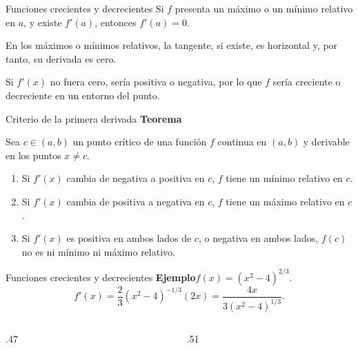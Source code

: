 \documentclass[main.tex]{subfiles}
\begin{document}
\begin{frame}{Funciones crecientes y decrecientes}
Si $f$ presenta un máximo o un mínimo relativo en $a$, y existe $f'(a)$, entonces $f'(a)=0$.
\medskip

En los máximos o mínimos relativos, la tangente, si existe, es horizontal y, por tanto, su derivada es cero.
\medskip

Si $f'(x)$ no fuera cero, sería positiva o negativa, por lo que $f$ sería creciente o decreciente en un entorno del punto.
\end{frame}
\begin{frame}{Criterio de la primera derivada}
\small\textbf{Teorema}\par Sea $c\in(a,b)$ un punto crítico de una función $f$ continua en $(a,b)$ y derivable en los puntos $x\ne c$.
\begin{enumerate}
\item Si $f'(x)$ cambia de negativa a positiva en $c$, $f$ tiene un mínimo relativo en $c$.
\item Si $f'(x)$ cambia de positiva a negativa en $c$, $f$ tiene un máximo relativo en $c$.
\item Si $f'(x)$ es positiva en ambos lados de $c$, o negativa en ambos lados, $f(c)$ no es ni mínimo ni máximo relativo.
\end{enumerate}
\end{frame}
\begin{frame}{Funciones crecientes y decrecientes}
\small\textbf{Ejemplo}\quad $f(x)=(x^2-4)^{2/3}$.
\[f'(x)=\frac23(x^2-4)^{-1/3}(2x)=\frac{4x}{3(x^2-4)^{1/3}}.\]
\begin{columns}[c]
\begin{column}{.47\textwidth}\end{column}
\begin{column}{.51\textwidth}\scriptsize
{}
\end{column}\end{columns}
\end{frame}
\end{document}
